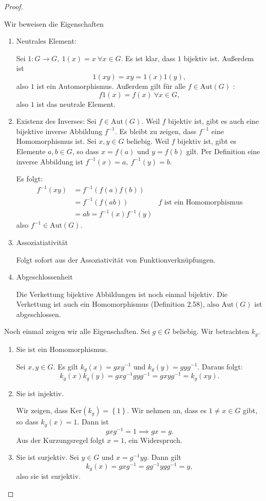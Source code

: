 \begin{proof}
	\begin{parts}
	\item Wir beweisen die Eigenschaften
		\begin{enumerate}[label=(\roman*)]
			\item Neutrales Element:

				Sei $1:G\to G,~1(x)=x~\forall x\in G$. Es ist klar, dass $1$ bijektiv ist. Außerdem ist
				\[
				1(xy)=xy=1(x)1(y)
			,\]
			also $1$ ist ein Automorphismus. Außerdem gilt f\"{u}r alle $f\in \text{Aut}(G)$ :
			 \[
			f 1(x)=f(x)~\forall x\in G
		,\]
		also $1$ ist das neutrale Element.
	\item Existenz des Inverses: Sei $f\in\text{Aut}(G)$. Weil $f$ bijektiv ist, gibt es auch eine bijektive inverse Abbildung $f^{-1}$. Es bleibt zu zeigen, dass $f^{-1}$ eine Homomorphismus ist. Sei $x,y\in G$ beliebig. Weil $f$ bijektiv ist, gibt es Elemente $a,b\in G$, so dass $x=f(a)$ und $y=f(b)$ gilt. Per Definition eine inverse Abbildung ist $f^{-1}(x)=a,~f^{-1}(y)=b$.

		Es folgt:
		\begin{align*}
			f^{-1}(xy)&=f^{-1}(f(a)f(b))\\
				  &=f^{-1}(f(ab)) & f\text{ ist ein Homomorphismus}\\
				  &=ab=f^{-1}(x)f^{-1}(y)
		\end{align*}
		also $f^{-1}\in \text{Aut}(G)$.
	\item Assoziatiativität

		Folgt sofort aus der Assoziativität von Funktionverknüpfungen.
	\item Abgeschlossenheit

		Die Verkettung bijektive Abbildungen ist noch einmal bijektiv. Die Verkettung ist auch ein Homomorphismus (Definition 2.58), also $\text{Aut}(G)$ ist abgeschlossen.
		\end{enumerate}
	\item Noch einmal zeigen wir alle Eigenschaften. Sei $g\in G$ beliebig. Wir betrachten $k_g$.
		\begin{enumerate}[label=(\roman*)]
			\item Sie ist ein Homomorphismus.

				Sei $x,y\in G$. Es gilt $k_g(x)=gxg^{-1}$ und $k_g(y)=gyg^{-1}$. Daraus folgt:
				\[
					k_g(x)k_g(y)=gxg^{-1}gyg^{-1}=gxyg^{-1}=k_g(xy)
				.\] 
			\item Sie ist injektiv.

				Wir zeigen, dass $\text{Ker}(k_g)=\left\{ 1 \right\} $. Wir nehmen an, dass es $1\neq x\in G$ gibt, so dass $k_g(x)=1$. Dann ist
				\[
					gxg^{-1}=1\implies gx=g
				.\] 
				Aus der Kurzungsregel folgt $x=1$, ein Widerspruch.
			\item Sie ist surjektiv. 
				Sei $y\in G$ und $x=g^{-1}yg$. Dann gilt
				\[
					k_g(x)=gxg^{-1}=gg^{-1}ygg^{-1}=y
				,\]
				also sie ist surjektiv.
		\end{enumerate}
	\end{parts}
\end{proof}
